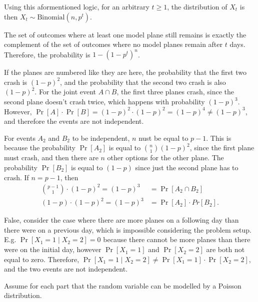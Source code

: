 \documentclass[11pt]{article}
\begin{document}
\begin{solution}
\begin{Parts}
\Part Using this aformentioned logic, for an arbitrary $t \geq 1$, the
distribution of $X_t$ is then $X_t \sim \mathrm{Binomial}(n, p^t)$.

\Part The set of outcomes where at least one model plane still remains is exactly
the complement of the set of outcomes where no model planes remain after $t$ days.
Therefore, the probability is $1-(1-p^t)^n$. 

\Part If the planes are numbered like they are here, the probability that the
first two crash is $(1-p)^2$, and the probability that the second two crash is
also $(1-p)^2$. For the joint event $A \cap B$, the first three planes crash,
since the second plane doesn't crash twice, which happens with probability
$(1-p)^3$. However, $\Pr[A] \cdot \Pr[B] = (1-p)^2 \cdot (1-p)^2 = (1-p)^4
\neq (1-p)^3$, and therefore the events are not independent. 

\Part For events $A_2$ and $B_2$ to be independent, $n$ nust be equal to $p-1$.
This is because the probability $\Pr[A_2]$ is equal to $\binom{n}{1}(1-p)^2$, 
since the first plane must crash, and then there are $n$ other options for the
other plane. The probability $\Pr[B_2]$ is equal to $(1-p)$ since just the 
second plane has to crash. If $n=p-1$, then
\[
    \begin{split}
        \binom{p-1}{1}\cdot(1-p)^2 = (1-p)^3 &= \Pr[A_2 \cap B_2] \\
        (1-p)\cdot(1-p)^2 = (1-p)^3 &= \Pr[A_2] \cdot Pr[B_2].
    \end{split}
\]

\Part False, consider the case where there are more planes on a following day 
than there were on a previous day, which is impossible considering the problem 
setup. E.g. $\Pr[X_1 = 1 \mid X_2 = 2] = 0$ because there cannot be more planes
than there were on the initial day, however $\Pr[X_1 = 1]$ and $\Pr[X_2 = 2]$ 
are both not equal to zero. Therefore, $\Pr[X_1 = 1 \mid X_2 = 2] \neq \Pr[X_1 = 1]
\cdot \Pr[X_2 = 2]$, and the two events are not independent. 

\end{Parts}

\end{solution}

Assume for each part that the random variable can be modelled by a Poisson distribution.
\end{document}

